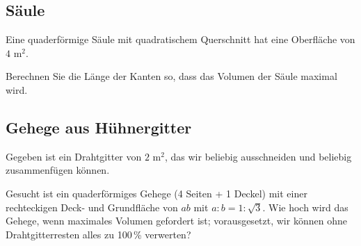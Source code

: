 



\subsection{Säule}

Eine quaderförmige Säule mit quadratischem Querschnitt hat eine Oberfläche von $4 \text{ m}^2$.

Berechnen Sie die Länge der Kanten so, dass das Volumen der Säule
maximal wird.

\subsection{Gehege aus Hühnergitter}

 Gegeben ist ein Drahtgitter von $2 \text{ m}^2$, das wir beliebig ausschneiden
    und beliebig zusammenfügen können.
    
    Gesucht ist ein quaderförmiges Gehege (4 Seiten + 1 Deckel) mit einer 
    rechteckigen Deck- und Grundfläche von $ab$ mit $a:b = 1:\sqrt{3}$.
    Wie hoch wird das Gehege, wenn maximales Volumen gefordert ist;
    vorausgesetzt, wir können ohne Drahtgitterresten alles zu 100\,\%
    verwerten?

